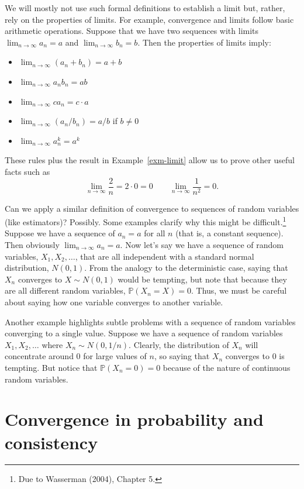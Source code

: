 \documentclass[
  letterpaper,
  DIV=11,
  numbers=noendperiod]{scrreprt}
\providecommand{\tightlist}{%
  \setlength{\itemsep}{0pt}\setlength{\parskip}{0pt}}\usepackage{longtable,booktabs,array}
\renewcommand{\P}{\mathbb{P}}
\theoremstyle{definition}
\theoremstyle{definition}
\theoremstyle{plain}
\theoremstyle{remark}
\begin{document}
We will mostly not use such formal definitions to establish a limit but,
rather, rely on the properties of limits. For example, convergence and
limits follow basic arithmetic operations. Suppose that we have two
sequences with limits \(\lim_{n\to\infty} a_n = a\) and
\(\lim_{n\to\infty} b_n = b\). Then the properties of limits imply:

\begin{itemize}
\tightlist
\item
  \(\lim_{n\to\infty} (a_n + b_n) = a + b\)
\item
  \(\lim_{n\to\infty} a_nb_n = ab\)
\item
  \(\lim_{n\to\infty} ca_n = c\cdot a\)
\item
  \(\lim_{n\to\infty} (a_n/b_n) = a/b\) if \(b \neq 0\)
\item
  \(\lim_{n\to\infty} a_n^{k} = a^{k}\)
\end{itemize}

These rules plus the result in Example~\ref{exm-limit} allow us to prove
other useful facts such as \[
\lim_{n\to\infty} \frac{2}{n} = 2 \cdot 0 = 0 \qquad  \lim_{n\to\infty} \frac{1}{n^{2}} = 0.
\]

Can we apply a similar definition of convergence to sequences of random
variables (like estimators)? Possibly. Some examples clarify why this
might be difficult.\footnote{Due to Wasserman (2004), Chapter 5.}
Suppose we have a sequence of \(a_n = a\) for all \(n\) (that is, a
constant sequence). Then obviously
\(\lim_{n\rightarrow\infty} a_n = a\). Now let's say we have a sequence
of random variables, \(X_1, X_2, \ldots\), that are all independent with
a standard normal distribution, \(N(0,1)\). From the analogy to the
deterministic case, saying that \(X_n\) converges to \(X \sim N(0, 1)\)
would be tempting, but note that because they are all different random
variables, \(\P(X_n = X) = 0\). Thus, we must be careful about saying
how one variable converges to another variable.

Another example highlights subtle problems with a sequence of random
variables converging to a single value. Suppose we have a sequence of
random variables \(X_1, X_2, \ldots\) where \(X_n \sim N(0, 1/n)\).
Clearly, the distribution of \(X_n\) will concentrate around 0 for large
values of \(n\), so saying that \(X_n\) converges to 0 is tempting. But
notice that \(\P(X_n = 0) = 0\) because of the nature of continuous
random variables.

\hypertarget{convergence-in-probability-and-consistency}{%
\section{Convergence in probability and
consistency}\label{convergence-in-probability-and-consistency}}
\end{document}
